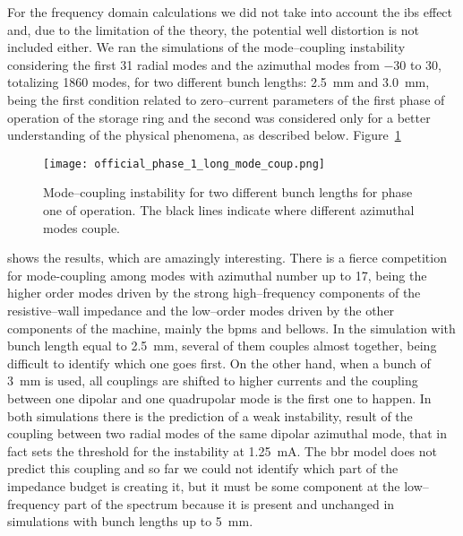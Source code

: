     For the frequency domain calculations we did not take into account the \gls{ibs} effect and, due to the limitation of the theory, the potential well distortion is not included either. We ran the simulations of the mode--coupling instability considering the first \num{31} radial modes and the azimuthal modes from \num{-30} to \num{30}, totalizing \num{1860} modes, for two different bunch lengths: \SI{2.5}{\milli\meter} and \SI{3.0}{\milli\meter}, being the first condition related to zero--current parameters of the first phase of operation of the storage ring and the second was considered only for a better understanding of the physical phenomena, as described below.
    Figure~\ref{fig:ph1_long_mode_coup}
    \begin{figure}
        \centering
        \texttt{[image: official\_phase\_1\_long\_mode\_coup.png]}
        \caption{Mode--coupling instability for two different bunch lengths for phase one of operation. The black lines indicate where different azimuthal modes couple.}
        \label{fig:ph1_long_mode_coup}
    \end{figure}
    shows the results, which are amazingly interesting. There is a fierce competition for mode-coupling among modes with azimuthal number up to \num{17}, being the higher order modes driven by the strong high--frequency components of the resistive--wall impedance and the low--order modes driven by the other components of the machine, mainly the \glspl{bpm} and bellows. In the simulation with bunch length equal to \SI{2.5}{\milli\meter}, several of them couples almost together, being difficult to identify which one goes first. On the other hand, when a bunch of \SI{3}{\milli\meter} is used, all couplings are shifted to higher currents and the coupling between one dipolar and one quadrupolar mode is the first one to happen. In both simulations there is the prediction of a weak instability, result of the coupling between two radial modes of the same dipolar azimuthal mode, that in fact sets the threshold for the instability at \SI{1.25}{\milli\ampere}. The \gls{bbr} model does not predict this coupling and so far we could not identify which part of the impedance budget is creating it, but it must be some component at the low--frequency part of the spectrum because it is present and unchanged in simulations with bunch lengths up to \SI{5}{\milli\meter}.

